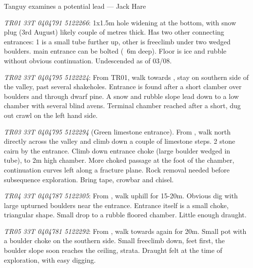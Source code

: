  \begin{marginfigure}
        		\centering
        		\caption{Tanguy examines a potential lead --- Jack Hare} 
		\label{cave in pavement}
        \end{marginfigure}
	
\begin{citemize}
	\item \emph{TR01 33T 0404791 5122266}: 1x1.5m hole widening at the bottom, with snow plug (3rd August) likely couple of metres thick. Has two other connecting entrances: 1 is a small tube further up, other is freeclimb under two wedged boulders. main entrance can be bolted (~6m deep). Floor is ice and rubble without obvious continuation. Undescended as of 03/08.

	\item \emph{TR02 33T 0404795 5122224}: From TR01, walk towards , stay on southern side of the valley, past several shakeholes. Entrance is found after a short clamber over boulders and through dwarf pine.  A snow and rubble slope lead down to a low chamber with several blind avens. Terminal chamber reached after a short, dug out crawl on the left hand side.

	\item \emph{TR03 33T 0404795 5122294} (Green limestone entrance). From , walk north directly across the valley and climb down a couple of limestone steps. 2 stone cairn by the entrance.  Climb down entrance choke (large boulder wedged in tube), to 2m high chamber. More choked passage at the foot of the chamber, continuation curves left along a fracture plane. Rock removal needed before subsequence exploration. Bring tape, crowbar and chisel.
	
	
        
	\item \emph{TR04 33T 0404787 5122305}: From , walk uphill for 15-20m. Obvious dig with large upturned boulders near the entrance. Entrance itself is a small choke, triangular shape. Small drop to a rubble floored chamber. Little enough draught.

	\item \emph{TR05 33T 0404781 5122292}: From , walk towards  again for 20m. Small pot with a boulder choke on the southern side. Small freeclimb down, feet first, the boulder slope soon reaches the ceiling, strata. Draught felt at the time of exploration, with easy digging.


\end{citemize}
